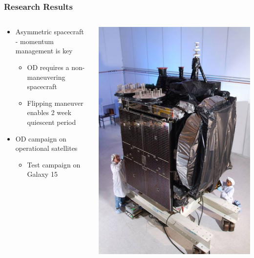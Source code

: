 \begin{frame}[t]\frametitle{Research Results}
    \begin{columns}
    \begin{column}{0.5\textwidth}
    \begin{itemize}
        \item Asymmetric spacecraft - momentum management is key
        \begin{itemize}
            \item OD requires a non-maneuvering spacecraft
            \item Flipping maneuver enables 2 week quiescent period
        \end{itemize}
        \item OD campaign on operational satellites
        \begin{itemize}
            \item Test campaign on Galaxy 15
        \end{itemize}
    \end{itemize}
    \end{column}
    \begin{column}{0.5\textwidth}
        \begin{center}
            \includegraphics[width=\columnwidth,height=0.6\textheight,keepaspectratio]{figures/airforce/galaxy15.jpg}

\end{center}
\end{column}
\end{columns}
\end{frame}
